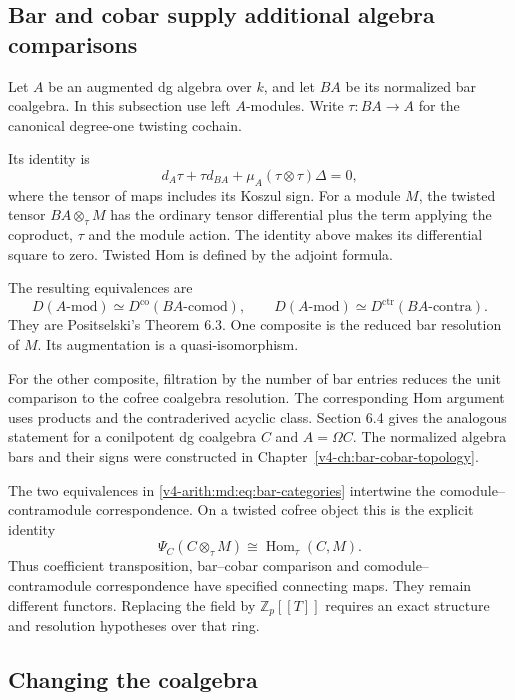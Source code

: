 \subsection{Bar and cobar supply additional algebra comparisons}

Let $A$ be an augmented dg algebra over $k$, and let $BA$ be
its normalized bar coalgebra. In this subsection use left
$A$-modules. Write $\tau:BA\to A$ for the
canonical degree-one twisting cochain.

Its identity is
\[
 d_A\tau+\tau d_{BA}+\mu_A(\tau\otimes\tau)\Delta=0,
\]
where the tensor of maps includes its Koszul sign.
For a module $M$, the twisted tensor $BA\otimes_\tau M$
has the ordinary tensor differential plus the term applying
the coproduct, $\tau$ and the module action. The identity above
makes its differential square to zero. Twisted Hom is defined
by the adjoint formula.

The resulting equivalences are
\begin{equation}\label{v4-arith:md:eq:bar-categories}
 D(A\text{-mod})\simeq D^{\mathrm{co}}(BA\text{-comod}),
 \qquad D(A\text{-mod})\simeq D^{\mathrm{ctr}}(BA\text{-contra}).
\end{equation}
They are Positselski's Theorem 6.3. One composite is the reduced
bar resolution of $M$. Its augmentation is a quasi-isomorphism.

For the other composite, filtration by the number of bar
entries reduces the unit comparison to the cofree coalgebra
resolution. The corresponding Hom argument uses products and
the contraderived acyclic class. Section 6.4 gives the analogous
statement for a conilpotent dg coalgebra $C$ and $A=\Omega C$.
The normalized algebra bars and their signs were constructed in
Chapter~\ref{v4-ch:bar-cobar-topology}.

The two equivalences in \eqref{v4-arith:md:eq:bar-categories}
intertwine the comodule--contramodule correspondence. On a
twisted cofree object this is the explicit identity
\[
 \Psi_C(C\otimes_\tau M)
 \cong\operatorname{Hom}_\tau(C,M).
\]
Thus coefficient transposition, bar--cobar comparison and
comodule--contramodule correspondence have specified connecting
maps. They remain different functors. Replacing the field by
$\mathbb Z_p[[T]]$ requires an exact structure and resolution
hypotheses over that ring.

\subsection{Changing the coalgebra}

